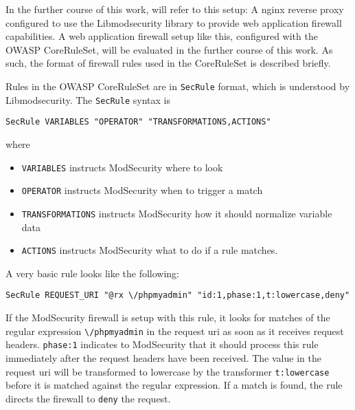 In the further course of this work,  will refer to this setup: A nginx reverse proxy configured to use the Libmodsecurity library to provide web application firewall capabilities.
A web application firewall setup like this, configured with the OWASP CoreRuleSet, will be evaluated in the further course of this work. As such, the format of firewall rules used in the CoreRuleSet is described briefly.

Rules in the OWASP CoreRuleSet are in \verb|SecRule| format, which is understood by Libmodsecurity. The \verb|SecRule| syntax is 

\begin{lstlisting}[style=basicStyle]
SecRule VARIABLES "OPERATOR" "TRANSFORMATIONS,ACTIONS"
\end{lstlisting}


where

\begin{itemize}
	\item \verb|VARIABLES| instructs ModSecurity where to look
	\item \verb|OPERATOR| instructs ModSecurity when to trigger a match
	\item \verb|TRANSFORMATIONS| instructs ModSecurity how it should normalize variable data
	\item \verb|ACTIONS| instructs ModSecurity what to do if a rule matches. 
\end{itemize}


A very basic rule looks like the following:

\begin{lstlisting}[style=basicStyle]
SecRule REQUEST_URI "@rx \/phpmyadmin" "id:1,phase:1,t:lowercase,deny"
\end{lstlisting}

If the ModSecurity firewall is setup with this rule, it looks for matches of the regular expression \verb|\/phpmyadmin| in the request uri as soon as it receives request headers. \verb|phase:1| indicates to ModSecurity that it should process this rule immediately after the request headers have been received.
The value in the request uri will be transformed to lowercase by the transformer \verb|t:lowercase| before it is matched against the regular expression. 
If a match is found, the rule directs the firewall to \verb|deny| the request. \cite{modsec/secRule, crs/creating}



